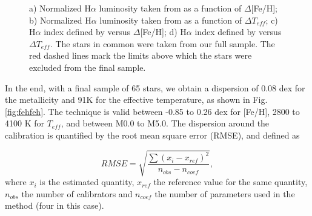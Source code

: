 \documentclass{aa}
\begin{document}
\begin{figure}[]
\begin{center}
\end{center}
\caption{ a) Normalized H$\alpha$ luminosity taken from \citet{Reiners-2012} as a function of $\Delta$[Fe/H]; b) Normalized H$\alpha$ luminosity taken from \citet{Reiners-2012} as a function of $\Delta T_{eff}$; c) H${\alpha}$ index defined by \citet{Gomes_da_Silva-2011} versus $\Delta$[Fe/H]; d) H${\alpha}$ index defined by \citet{Gomes_da_Silva-2011} versus $\Delta T_{eff}$. The stars in common were taken from our full sample. The red dashed lines mark the limits above which the stars were excluded from the final sample.}
\label{fig:act_test}
\end{figure}

In the end, with a final sample of 65 stars, we obtain a dispersion of 0.08 dex for the metallicity and 91K for the effective temperature, as shown in Fig. \ref{fig:fehfeh}. The technique is valid between -0.85 to 0.26 dex for [Fe/H], 2800 to 4100 K for $T_{eff}$, and between M0.0 to M5.0. The dispersion around the calibration is quantified by the root mean square error (RMSE), and defined as

\begin{equation}
RMSE = \sqrt{\frac{\sum{(x_{i}-x_{ref})^{2}}}{n_{obs}-n_{coef}}},
\end{equation}
where $x_{i}$ is the estimated quantity, $x_{ref}$ the reference value for the same quantity, $n_{obs}$ the number of calibrators and $n_{coef}$ the number of parameters used in the method (four in this case). 
\end{document}
